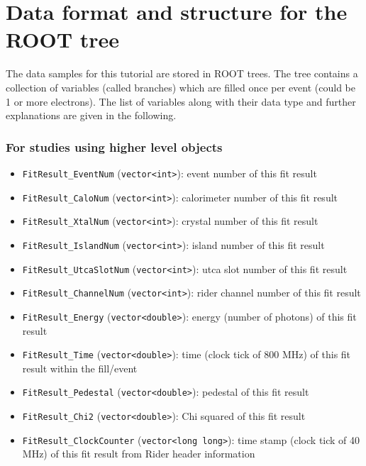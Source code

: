 \chapter{Data format and structure for the ROOT tree}
\label{chap:three}

The data samples for this tutorial are stored in ROOT trees. The tree contains a collection of variables (called branches) which are filled once per event (could be 1 or more electrons). The list of variables along with their data type and further explanations are given in the following.

\subsection*{For studies using higher level objects}

\begin{itemize}

\item \verb+FitResult_EventNum+ (\verb+vector<int>+): event number of this fit result
\item \verb+FitResult_CaloNum+ (\verb+vector<int>+): calorimeter number of this fit result
\item \verb+FitResult_XtalNum+ (\verb+vector<int>+): crystal number of this fit result
\item \verb+FitResult_IslandNum+ (\verb+vector<int>+): island number of this fit result
\item \verb+FitResult_UtcaSlotNum+ (\verb+vector<int>+): utca slot number of this fit result
\item \verb+FitResult_ChannelNum+ (\verb+vector<int>+): rider channel number of this fit result
\item \verb+FitResult_Energy+ (\verb+vector<double>+): energy (number of photons) of this fit result
\item \verb+FitResult_Time+ (\verb+vector<double>+): time (clock tick of 800 MHz) of this fit result within the fill/event
\item \verb+FitResult_Pedestal+ (\verb+vector<double>+): pedestal of this fit result
\item \verb+FitResult_Chi2+ (\verb+vector<double>+): Chi squared of this fit result
\item \verb+FitResult_ClockCounter+ (\verb+vector<long long>+): time stamp (clock tick of 40 MHz) of this fit result from Rider header information


\end{itemize}
